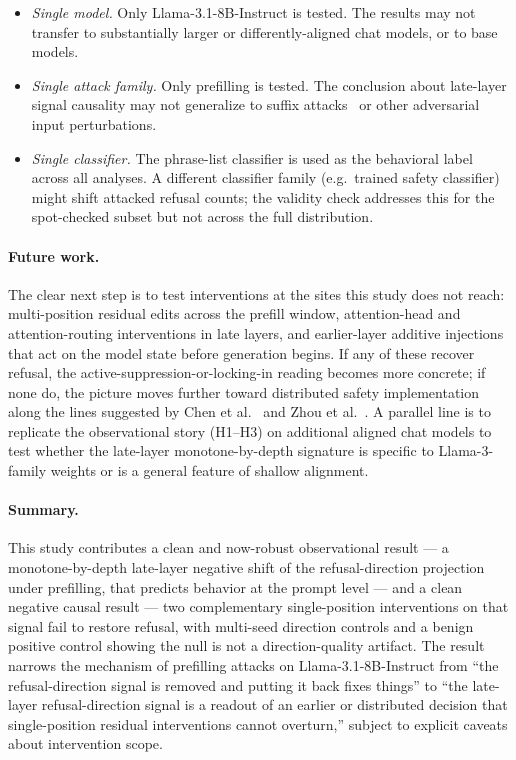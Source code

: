 \documentclass{article}
\begin{document}
\begin{itemize}
\item \emph{Single model.} Only Llama-3.1-8B-Instruct is tested. The
  results may not transfer to substantially larger or differently-aligned
  chat models, or to base models.
\item \emph{Single attack family.} Only prefilling is tested. The
  conclusion about late-layer signal causality may not generalize to
  suffix attacks~\cite{zou2023advbench} or other adversarial input
  perturbations.
\item \emph{Single classifier.} The phrase-list classifier is used as
  the behavioral label across all analyses. A different classifier
  family (e.g.\ trained safety classifier) might shift attacked
  refusal counts; the validity check addresses this for the spot-checked
  subset but not across the full distribution.
\end{itemize}

\paragraph{Future work.}
The clear next step is to test interventions at the sites this study
does not reach: multi-position residual edits across the prefill window,
attention-head and attention-routing interventions in late layers, and
earlier-layer additive injections that act on the model state before
generation begins. If any of these recover refusal, the
active-suppression-or-locking-in reading becomes more concrete; if none
do, the picture moves further toward distributed safety implementation
along the lines suggested by Chen et al.~\cite{chen2025safetyneurons}
and Zhou et al.~\cite{zhou2025safetyheads}. A parallel line is to
replicate the observational story (H1--H3) on additional aligned chat
models to test whether the late-layer monotone-by-depth signature is
specific to Llama-3-family weights or is a general feature of shallow
alignment.

\paragraph{Summary.}
This study contributes a clean and now-robust observational result --- a
monotone-by-depth late-layer negative shift of the refusal-direction
projection under prefilling, that predicts behavior at the prompt level
--- and a clean negative causal result --- two complementary
single-position interventions on that signal fail to restore refusal,
with multi-seed direction controls and a benign positive control showing
the null is not a direction-quality artifact. The result narrows the
mechanism of prefilling attacks on Llama-3.1-8B-Instruct from ``the
refusal-direction signal is removed and putting it back fixes things''
to ``the late-layer refusal-direction signal is a readout of an earlier
or distributed decision that single-position residual interventions
cannot overturn,'' subject to explicit caveats about intervention
scope.



\end{document}
